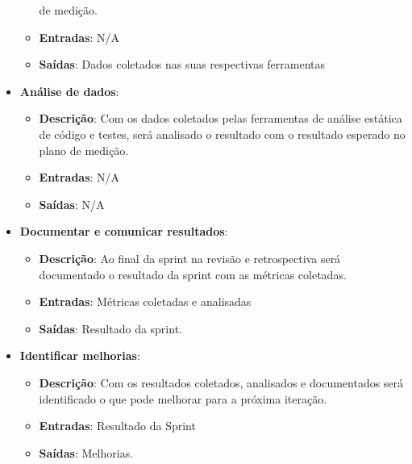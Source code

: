\begin{itemize}
\begin{itemize}
    de medição.
    \item \textbf{Entradas}: N/A
    \item \textbf{Saídas}: Dados coletados nas suas respectivas ferramentas
  \end{itemize}
  \item \textbf{Análise de dados}:
  \begin{itemize}
    \item \textbf{Descrição}: Com os dados coletados pelas ferramentas de análise estática de código e testes, será
    analisado o resultado com o resultado esperado no plano de medição.
    \item \textbf{Entradas}: N/A
    \item \textbf{Saídas}: N/A
  \end{itemize}
  \item \textbf{Documentar e comunicar resultados}:
  \begin{itemize}
    \item \textbf{Descrição}: Ao final da sprint na revisão e retrospectiva será documentado o resultado da sprint com as
    métricas coletadas.
    \item \textbf{Entradas}: Métricas coletadas e analisadas
    \item \textbf{Saídas}: Resultado da sprint.
  \end{itemize}
  \item \textbf{Identificar melhorias}:
  \begin{itemize}
    \item \textbf{Descrição}: Com os resultados coletados, analisados e documentados será identificado o que pode melhorar
    para a próxima iteração.
    \item \textbf{Entradas}: Resultado da Sprint
    \item \textbf{Saídas}: Melhorias.
  \end{itemize}
\end{itemize}
